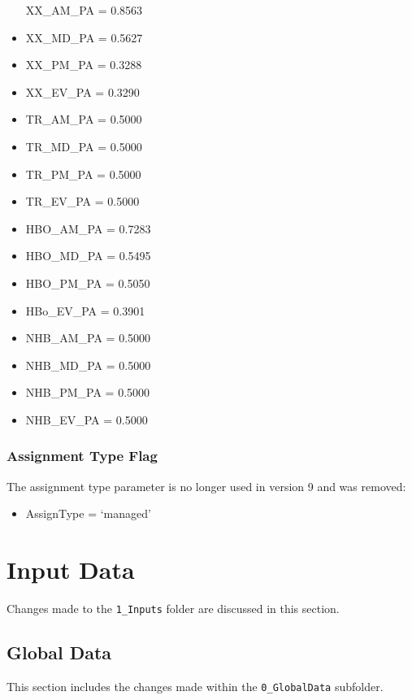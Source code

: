 \documentclass[
  letterpaper,
  DIV=11,
  numbers=noendperiod]{scrreprt}
\providecommand{\tightlist}{%
  \setlength{\itemsep}{0pt}\setlength{\parskip}{0pt}}\usepackage{longtable,booktabs,array}
\begin{document}
\begin{itemize}
  XX\_AM\_PA = 0.8563
\item
  XX\_MD\_PA = 0.5627
\item
  XX\_PM\_PA = 0.3288
\item
  XX\_EV\_PA = 0.3290
\item
  TR\_AM\_PA = 0.5000
\item
  TR\_MD\_PA = 0.5000
\item
  TR\_PM\_PA = 0.5000
\item
  TR\_EV\_PA = 0.5000
\item
  HBO\_AM\_PA = 0.7283
\item
  HBO\_MD\_PA = 0.5495
\item
  HBO\_PM\_PA = 0.5050
\item
  HBo\_EV\_PA = 0.3901
\item
  NHB\_AM\_PA = 0.5000
\item
  NHB\_MD\_PA = 0.5000
\item
  NHB\_PM\_PA = 0.5000
\item
  NHB\_EV\_PA = 0.5000
\end{itemize}

\hypertarget{assignment-type-flag}{%
\subsection{Assignment Type Flag}\label{assignment-type-flag}}

The assignment type parameter is no longer used in version 9 and was
removed:

\begin{itemize}
\tightlist
\item
  AssignType = `managed'
\end{itemize}


\hypertarget{input-data}{%
\chapter{Input Data}\label{input-data}}

Changes made to the \texttt{1\_Inputs} folder are discussed in this
section.

\hypertarget{global-data}{%
\section{Global Data}\label{global-data}}

This section includes the changes made within the \texttt{0\_GlobalData}
subfolder.
\end{document}
